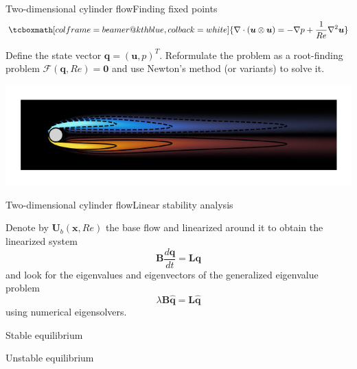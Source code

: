 \documentclass[usenames,dvipsnames,svgnames,10pt,aspectratio=169]{beamer}
\begin{document}
\begin{frame}[t, c]{Two-dimensional cylinder flow}{Finding fixed points}
    \[
    \tcboxmath[colframe=beamer@kthblue, colback=white]{
      \nabla \cdot \left( \bm{u} \otimes \bm{u} \right) = - \nabla p + \dfrac{1}{Re} \nabla^2 \bm{u}
    }
    \]
    
    \bigskip
    
    Define the state vector $\bm{q} = \left( \bm{u}, p \right)^T$.
    Reformulate the problem as a root-finding problem $\mathcal{F}(\bm{q}, Re) = \bm{0}$ and use Newton's method (or variants) to solve it.

    \begin{center}
      \includegraphics[width=.75\textwidth]{baseflow}
    \end{center}

\end{frame}



\begin{frame}[t, c]{Two-dimensional cylinder flow}{Linear stability analysis}
  \begin{minipage}{.58\textwidth}
    Denote by $\bm{U}_b(\bm{x}, Re)$ the base flow and linearized around it to obtain the linearized system
    \[
    \bm{B} \dfrac{d\bm{q}}{dt} = \bm{Lq}
    \]
    and look for the eigenvalues and eigenvectors of the generalized eigenvalue problem
    \[
    \lambda \bm{B} \hat{\bm{q}} = \bm{L} \hat{\bm{q}}
    \]
    using numerical eigensolvers.
  \end{minipage}%
  \hfill
  \begin{minipage}{.38\textwidth}
    \centering

    \bigskip

    Stable equilibrium

    \bigskip

    \bigskip


    Unstable equilibrium
  \end{minipage}
\end{frame}
\end{document}
